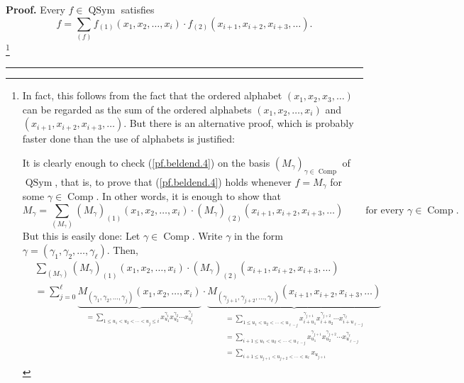 \documentclass
[numbers=enddot,12pt,final,onecolumn,notitlepage,abstracton]{scrartcl}%
\theoremstyle{definition}
\newenvironment{proof}[1][Proof]{\noindent\textbf{#1.} }{\ \rule{0.5em}{0.5em}}
\newenvironment{noncompile}{}{}
\let\sumnonlimits\sum
\renewcommand{\sum}{\sumnonlimits\limits}
\begin{document}
\begin{noncompile}
\begin{proof}
Every $f\in\operatorname*{QSym}$ satisfies%
\begin{equation}
f=\sum_{\left(  f\right)  }f_{\left(  1\right)  }\left(  x_{1},x_{2}%
,\ldots,x_{i}\right)  \cdot f_{\left(  2\right)  }\left(  x_{i+1}%
,x_{i+2},x_{i+3},\ldots\right)  . \label{pf.beldend.4}%
\end{equation}
\footnote{In fact, this follows from the fact that the ordered alphabet
$\left(  x_{1},x_{2},x_{3},\ldots\right)  $ can be regarded as the sum of the
ordered alphabets $\left(  x_{1},x_{2},\ldots,x_{i}\right)  $ and $\left(
x_{i+1},x_{i+2},x_{i+3},\ldots\right)  $. But there is an alternative proof,
which is probably faster done than the use of alphabets is justified:
\par
It is clearly enough to check (\ref{pf.beldend.4}) on the basis $\left(
M_{\gamma}\right)  _{\gamma\in\operatorname*{Comp}}$ of $\operatorname*{QSym}%
$, that is, to prove that (\ref{pf.beldend.4}) holds whenever $f=M_{\gamma}$
for some $\gamma\in\operatorname*{Comp}$. In other words, it is enough to show
that
\[
M_{\gamma}=\sum_{\left(  M_{\gamma}\right)  }\left(  M_{\gamma}\right)
_{\left(  1\right)  }\left(  x_{1},x_{2},\ldots,x_{i}\right)  \cdot\left(
M_{\gamma}\right)  _{\left(  2\right)  }\left(  x_{i+1},x_{i+2},x_{i+3}%
,\ldots\right)  \ \ \ \ \ \ \ \ \ \ \text{for every }\gamma\in
\operatorname*{Comp}.
\]
But this is easily done: Let $\gamma\in\operatorname*{Comp}$. Write $\gamma$
in the form $\gamma=\left(  \gamma_{1},\gamma_{2},\ldots,\gamma_{\ell}\right)
$. Then,%
\begin{align*}
&  \sum_{\left(  M_{\gamma}\right)  }\left(  M_{\gamma}\right)  _{\left(
1\right)  }\left(  x_{1},x_{2},\ldots,x_{i}\right)  \cdot\left(  M_{\gamma
}\right)  _{\left(  2\right)  }\left(  x_{i+1},x_{i+2},x_{i+3},\ldots\right)
\\
&  =\sum_{j=0}^{\ell}\underbrace{M_{\left(  \gamma_{1},\gamma_{2}%
,\ldots,\gamma_{j}\right)  }\left(  x_{1},x_{2},\ldots,x_{i}\right)  }%
_{=\sum_{1\leq u_{1}<u_{2}<\cdots<u_{j}\leq i}x_{u_{1}}^{\gamma_{1}}x_{u_{2}%
}^{\gamma_{2}}\cdots x_{u_{j}}^{\gamma_{j}}}\cdot\underbrace{M_{\left(
\gamma_{j+1},\gamma_{j+2},\ldots,\gamma_{\ell}\right)  }\left(  x_{i+1}%
,x_{i+2},x_{i+3},\ldots\right)  }_{\substack{=\sum_{1\leq u_{1}<u_{2}%
<\cdots<u_{\ell-j}}x_{i+u_{1}}^{\gamma_{j+1}}x_{i+u_{2}}^{\gamma_{j+2}}\cdots
x_{i+u_{\ell-j}}^{\gamma_{\ell}}\\=\sum_{i+1\leq u_{1}<u_{2}<\cdots<u_{\ell
-j}}x_{u_{1}}^{\gamma_{j+1}}x_{u_{2}}^{\gamma_{j+2}}\cdots x_{u_{\ell-j}%
}^{\gamma_{\ell}}\\=\sum_{i+1\leq u_{j+1}<u_{j+2}<\cdots<u_{\ell}}x_{u_{j+1}%
}}}
\end{align*}}
\end{proof}
\end{noncompile}
\end{document}
